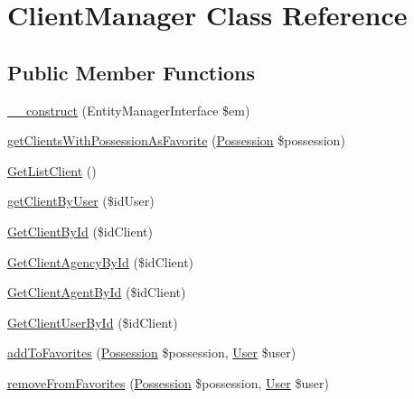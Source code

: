 \hypertarget{class_app_1_1_b_l_1_1_client_manager}{}\section{Client\+Manager Class Reference}
\label{class_app_1_1_b_l_1_1_client_manager}
\subsection*{Public Member Functions}
\begin{DoxyCompactItemize}
\item 
\mbox{\hyperlink{class_app_1_1_b_l_1_1_client_manager_a25f4258aeb5ce2a61a2504cb7c058485}{\+\_\+\+\_\+construct}} (Entity\+Manager\+Interface \$em)
\item 
\mbox{\hyperlink{class_app_1_1_b_l_1_1_client_manager_a04d532b0b319982ca22034751805bd54}{get\+Clients\+With\+Possession\+As\+Favorite}} (\mbox{\hyperlink{class_app_1_1_entity_1_1_possession}{Possession}} \$possession)
\item 
\mbox{\hyperlink{class_app_1_1_b_l_1_1_client_manager_a388df05d7f84ce50d3ab96a175d2a98e}{Get\+List\+Client}} ()
\item 
\mbox{\hyperlink{class_app_1_1_b_l_1_1_client_manager_a8fd0a8928e20a9c8b64c3f76746ead77}{get\+Client\+By\+User}} (\$id\+User)
\item 
\mbox{\hyperlink{class_app_1_1_b_l_1_1_client_manager_a452c66c416e969a1dfc3c93a829f6b89}{Get\+Client\+By\+Id}} (\$id\+Client)
\item 
\mbox{\hyperlink{class_app_1_1_b_l_1_1_client_manager_a38e6b1335c1b5143049516a85f95f580}{Get\+Client\+Agency\+By\+Id}} (\$id\+Client)
\item 
\mbox{\hyperlink{class_app_1_1_b_l_1_1_client_manager_a4ab8f249602685b2f2bb60ca37e01621}{Get\+Client\+Agent\+By\+Id}} (\$id\+Client)
\item 
\mbox{\hyperlink{class_app_1_1_b_l_1_1_client_manager_a7ae8d607f90b2993e3c58abe41af7b7d}{Get\+Client\+User\+By\+Id}} (\$id\+Client)
\item 
\mbox{\hyperlink{class_app_1_1_b_l_1_1_client_manager_ab1d089c74735e10bda2c731e7f6084b5}{add\+To\+Favorites}} (\mbox{\hyperlink{class_app_1_1_entity_1_1_possession}{Possession}} \$possession, \mbox{\hyperlink{class_app_1_1_entity_1_1_user}{User}} \$user)
\item 
\mbox{\hyperlink{class_app_1_1_b_l_1_1_client_manager_a2d22ea4606c81445dcbe1cc64fa7b6f9}{remove\+From\+Favorites}} (\mbox{\hyperlink{class_app_1_1_entity_1_1_possession}{Possession}} \$possession, \mbox{\hyperlink{class_app_1_1_entity_1_1_user}{User}} \$user)
\end{DoxyCompactItemize}
